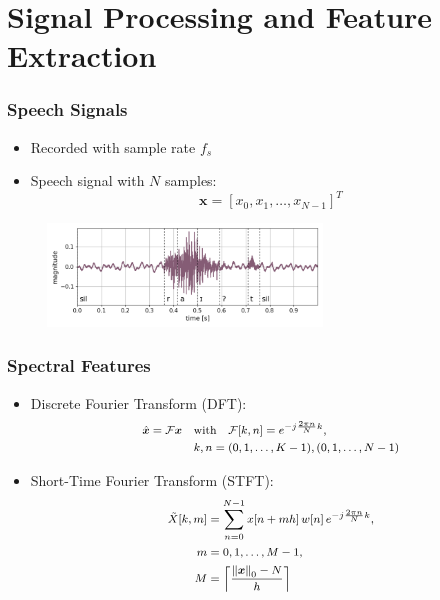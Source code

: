 
\section{Signal Processing and Feature Extraction}
\begin{frame}
  \frametitle{Speech Signals}
  \begin{itemize}
    \item Recorded with sample rate $f_s$
    \item Speech signal with $N$ samples:
    \begin{equation*}\label{eq:signal_raw_x}
      \bm{x} = [x_0, x_1, \dots, x_{N-1}]^T
    \end{equation*}
  \end{itemize}
  \begin{figure} \includegraphics[width=0.65\textwidth]{../3_signal/figs/signal_raw_showcase_right0.png} \end{figure}
\end{frame}

\begin{frame}
  \frametitle{Spectral Features}
  \begin{itemize}
    \item Discrete Fourier Transform (DFT):
    \begin{equation*}\label{eq:signal_spec_dtft_matrix}
      \footnotesize
      \begin{aligned}
        \hat{\bm{x}} = \mathcal{F} \bm{x} \quad & \mathrm{with} 
        \quad \mathcal{F}[k, n] = e^{-j\frac{2 \pi n}{N} k},\\
        &k, n = (0, 1, \dots, K-1), (0, 1, \dots, N-1)
      \end{aligned}
    \end{equation*}

    \item Short-Time Fourier Transform (STFT):
    \begin{equation*}\label{eq:signal_spec_stft}
      \footnotesize
      \begin{aligned}
        \tilde{X}[k, m] &= \sum_{n=0}^{N-1} x[n + m h] \, w[n] \, e^{-j\frac{2 \pi n}{N}k},\\ 
        m &= 0, 1, \dots, M - 1,\\
        M &= \ceil*{\frac{\norm{\bm{x}}_0-N}{h}}
      \end{aligned}
    \end{equation*}
  \end{itemize}
\end{frame}

